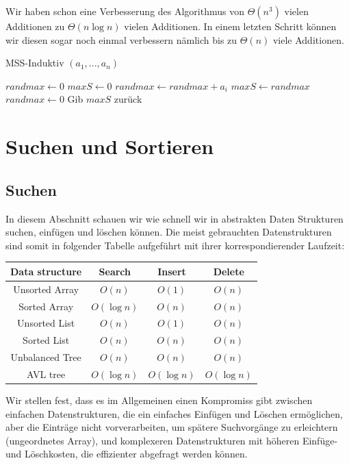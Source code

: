 \documentclass[a4paper]{article}
\begin{document}
    Wir haben schon eine Verbesserung des Algorithmus von $\Theta(n^3)$ vielen Additionen zu $\Theta(n\log n)$ vielen Additionen. In einem letzten Schritt können wir diesen sogar noch einmal verbessern nämlich bis zu $\Theta(n)$ viele Additionen.

\begin{algorithm}
 \caption{MSS-Induktiv $(a_1,..., a_n)$}\label{MSS-Induktiv}
    \begin{algorithmic}[1]
    \State $randmax \gets 0$
    \State $maxS \gets 0$
            \State $randmax \gets randmax + a_i$
                \State $maxS \gets randmax$
            \EndIf
                \State $randmax \gets 0$
            \EndIf
        \State Gib $maxS$ zurück
        \EndFor
    \EndFunction
    \end{algorithmic}
\end{algorithm}

\newpage
\section{Suchen und Sortieren}
\subsection{Suchen}
    In diesem Abschnitt schauen wir wie schnell wir in abstrakten Daten Strukturen suchen, einfügen und löschen können. Die meist gebrauchten Datenstrukturen sind somit in folgender Tabelle aufgeführt mit ihrer korrespondierender Laufzeit: \\
\begin{center}      
\begin{tabular} {|c|c|c|c|}
  \hline
  \label{Tab: LaufzeitenSuchSortier}
  \bfseries Data structure & \bfseries Search & \bfseries Insert & \bfseries Delete\\
  \hline
  Unsorted Array	&$O(n)$				&$O(1)$			&$O(n)$\\
  Sorted Array		&$O(\log{n})$	          	&$O(n)$			&$O(n)$\\
  Unsorted List 	&$O(n)$				&$O(1)$			&$O(n)$\\	
  Sorted List		&$O(n)$				&$O(n)$			&$O(n)$\\	
  Unbalanced Tree	&$O(n)$				&$O(n)$			&$O(n)$\\
  AVL tree		&$O(\log{n})$	        	&$O(\log{n})$	        &$O(\log{n})$\\
  \hline
\end{tabular}
\end{center}  
Wir stellen fest, dass es im Allgemeinen einen Kompromiss gibt zwischen einfachen Datenstrukturen, die ein einfaches Einfügen und Löschen ermöglichen, aber die Einträge nicht vorverarbeiten, um spätere Suchvorgänge zu erleichtern (ungeordnetes Array), und komplexeren Datenstrukturen mit höheren Einfüge- und Löschkosten, die effizienter abgefragt werden können.
\end{document}
